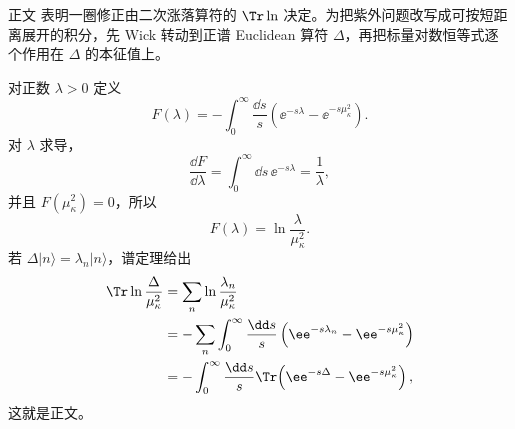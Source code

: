\begin{derivation}

正文 表明一圈修正由二次涨落算符的 $\Tr\ln$ 决定。为把紫外问题改写成可按短距离展开的积分，先 Wick 转动到正谱 Euclidean 算符 $\Delta$，再把标量对数恒等式逐个作用在 $\Delta$ 的本征值上。

对正数 $\lambda>0$ 定义
\begin{equation*}
 F(\lambda)
 =-\int_0^\infty\frac{\dd s}{s}
 \left(\ee^{-s\lambda}-\ee^{-s\mu_\kappa^2}\right).
\end{equation*}
对 $\lambda$ 求导，
\begin{equation*}
 \frac{\dd F}{\dd\lambda}
 =\int_0^\infty\dd s\,\ee^{-s\lambda}
 =\frac1\lambda,
\end{equation*}
并且 $F(\mu_\kappa^2)=0$，所以
\begin{equation*}
 F(\lambda)=\ln\frac{\lambda}{\mu_\kappa^2}.
\end{equation*}
若 $\Delta|n\rangle=\lambda_n|n\rangle$，谱定理给出
\begin{align*}
 \Tr\ln\frac{\Delta}{\mu_\kappa^2}
 &=\sum_n\ln\frac{\lambda_n}{\mu_\kappa^2}\\
 &=-\sum_n\int_0^\infty\frac{\dd s}{s}
 \left(\ee^{-s\lambda_n}-\ee^{-s\mu_\kappa^2}\right)\\
 &=-\int_0^\infty\frac{\dd s}{s}
 \Tr\!\left(\ee^{-s\Delta}-\ee^{-s\mu_\kappa^2}\right),
\end{align*}
这就是正文。
\end{derivation}


